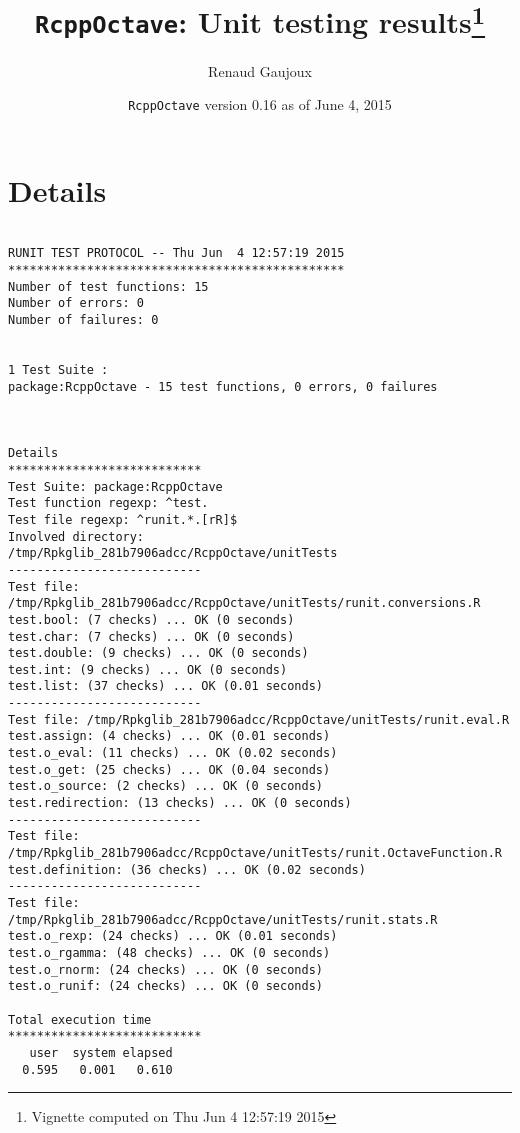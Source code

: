 \documentclass[10pt]{article}\usepackage[]{graphicx}\usepackage[]{color}
\author{Renaud Gaujoux}
\title{\texttt{RcppOctave}: Unit testing results\footnote{Vignette computed  on Thu Jun  4 12:57:19 2015}}
\date{\texttt{RcppOctave} version 0.16 as of June  4, 2015}
\begin{document}
\maketitle

\section{Details}
\begin{verbatim}

RUNIT TEST PROTOCOL -- Thu Jun  4 12:57:19 2015 
*********************************************** 
Number of test functions: 15 
Number of errors: 0 
Number of failures: 0 

 
1 Test Suite : 
package:RcppOctave - 15 test functions, 0 errors, 0 failures



Details 
*************************** 
Test Suite: package:RcppOctave 
Test function regexp: ^test. 
Test file regexp: ^runit.*.[rR]$ 
Involved directory: 
/tmp/Rpkglib_281b7906adcc/RcppOctave/unitTests 
--------------------------- 
Test file: /tmp/Rpkglib_281b7906adcc/RcppOctave/unitTests/runit.conversions.R 
test.bool: (7 checks) ... OK (0 seconds)
test.char: (7 checks) ... OK (0 seconds)
test.double: (9 checks) ... OK (0 seconds)
test.int: (9 checks) ... OK (0 seconds)
test.list: (37 checks) ... OK (0.01 seconds)
--------------------------- 
Test file: /tmp/Rpkglib_281b7906adcc/RcppOctave/unitTests/runit.eval.R 
test.assign: (4 checks) ... OK (0.01 seconds)
test.o_eval: (11 checks) ... OK (0.02 seconds)
test.o_get: (25 checks) ... OK (0.04 seconds)
test.o_source: (2 checks) ... OK (0 seconds)
test.redirection: (13 checks) ... OK (0 seconds)
--------------------------- 
Test file: /tmp/Rpkglib_281b7906adcc/RcppOctave/unitTests/runit.OctaveFunction.R 
test.definition: (36 checks) ... OK (0.02 seconds)
--------------------------- 
Test file: /tmp/Rpkglib_281b7906adcc/RcppOctave/unitTests/runit.stats.R 
test.o_rexp: (24 checks) ... OK (0.01 seconds)
test.o_rgamma: (48 checks) ... OK (0 seconds)
test.o_rnorm: (24 checks) ... OK (0 seconds)
test.o_runif: (24 checks) ... OK (0 seconds)

Total execution time
***************************
   user  system elapsed 
  0.595   0.001   0.610 

\end{verbatim}
\end{document}
